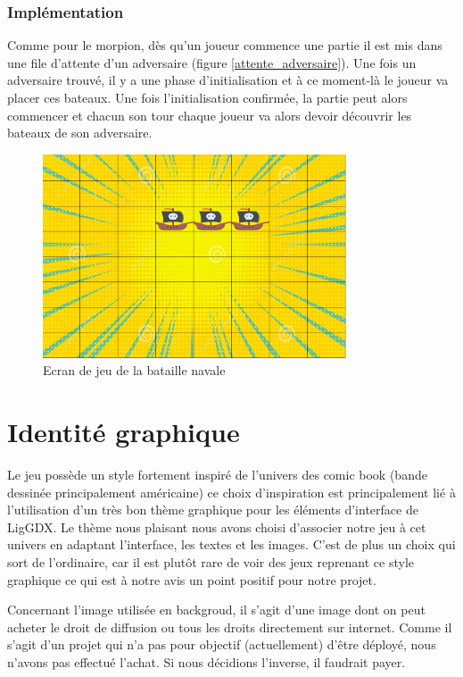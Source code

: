 \documentclass{report}
\begin{document}
\subsection{Implémentation}
Comme pour le morpion, dès qu'un joueur commence une partie il est mis dans une file d'attente d'un adversaire (figure \ref{attente_adversaire}).
Une fois un adversaire trouvé, il y a une phase d'initialisation et à ce moment-là le joueur va placer ces bateaux. Une fois l'initialisation confirmée,
la partie peut alors commencer et chacun son tour chaque joueur va alors devoir découvrir les bateaux de son adversaire.

\begin{figure}[H]
	\centering\includegraphics[width=9cm]{notreBataille}
	\caption{Ecran de jeu de la bataille navale}
	\label{notreBataille}
\end{figure}

\chapter{Identité graphique}
Le jeu possède un style fortement inspiré de l'univers des comic book (bande dessinée principalement américaine)
ce choix d'inspiration est principalement lié à l'utilisation d'un très bon thème graphique pour les éléments
d'interface de LigGDX. Le thème nous plaisant nous avons choisi d'associer notre jeu à cet univers en adaptant l'interface, les
textes et les images. C'est de plus un choix qui sort de l'ordinaire, car il est plutôt rare de voir des jeux
reprenant ce style graphique ce qui est à notre avis un point positif pour notre projet.
\par
Concernant l'image utilisée en backgroud, il s'agit d'une image dont on peut acheter le droit de diffusion ou tous les droits directement sur internet. Comme il s'agit d'un projet qui n'a pas pour objectif (actuellement) d'être déployé, nous n'avons pas effectué l'achat. Si nous décidions l'inverse, il faudrait payer.
\end{document}
